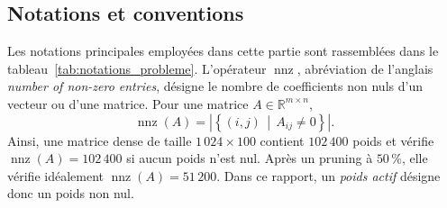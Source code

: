 
\subsection{Notations et conventions}
\label{ssec:probleme_notations}

Les notations principales employées dans cette partie sont rassemblées dans
le tableau~\ref{tab:notations_probleme}. L'opérateur
$\operatorname{nnz}$, abréviation de l'anglais \emph{number of non-zero
entries}, désigne le nombre de coefficients non nuls d'un vecteur ou d'une
matrice. Pour une matrice $A\in\mathbb{R}^{m\times n}$,
\begin{equation}
    \operatorname{nnz}(A)
    =\left|\left\{(i,j)\,\middle|\,A_{ij}\neq0\right\}\right|.
    \label{eq:def_nnz}
\end{equation}
Ainsi, une matrice dense de taille $1\,024\times100$ contient $102\,400$ poids
et vérifie $\operatorname{nnz}(A)=102\,400$ si aucun poids n'est nul. Après
un pruning à $50\,\%$, elle vérifie idéalement
$\operatorname{nnz}(A)=51\,200$. Dans ce rapport, un \emph{poids actif}
désigne donc un poids non nul.

